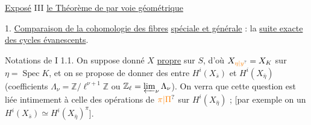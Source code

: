 \uline{Exposé} III \uline{le Théorème de  par voie géométrique}

1. \uline{Comparaison de la cohomologie des  fibres}   \uline{spéciale et générale} : la \uline{suite exacte des cycles évanescents}.


Notations de I 1.1. On suppose donné $X$ \uline{propre} sur $S$, d'où $X_{\unsure{\eta|y}}=X_K$ sur $\eta=\operatorname{Spec}K$, et on se propose de  donner des  entre $H^i(X_{\bar s})$ et $H^i(X_{\bar\eta})$ (coefficients $\Lambda_\nu=\mathbb Z/\ell^{\nu+1}\mathbb Z$ ou $\mathbb Z_\ell=\varprojlim_\nu\Lambda_\nu$). On verra que cette question est liée intimement à celle des opérations de $\unsure{\pi|\Pi}$ sur $H^i(X_{\bar\eta})$ ; [par exemple on  un  $H^i(X_{\bar s})\simeq H^i(X_{\bar\eta})^\pi$].

